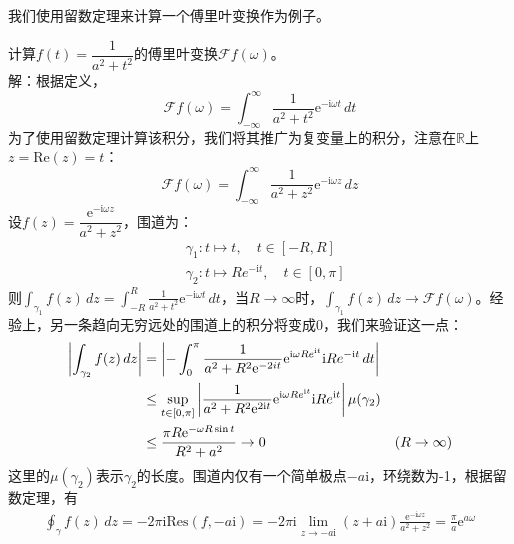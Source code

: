 我们使用留数定理来计算一个傅里叶变换作为例子。
\begin{example}
    计算$f(t)=\dfrac{1}{a^2+t^2}$的傅里叶变换$\mathcal{F} f(\omega)$。\\
    解：根据定义，$$\mathcal{F} f(\omega)=\int_{-\infty}^{\infty}\dfrac{1}{a^2+t^2}\mathrm{e}^{-\mathrm{i}\omega t}\,dt$$
    为了使用留数定理计算该积分，我们将其推广为复变量上的积分，注意在$\mathbb{R}$上$z=\mathrm{Re}(z)=t$：
    \[\mathcal{F} f(\omega)=\int_{-\infty}^{\infty}\frac{1}{a^2+z^2}\mathrm{e}^{-\mathrm{i}\omega z}\,dz\]
    设$f(z)=\dfrac{\mathrm{e}^{-\mathrm{i}\omega z}}{a^2+z^2}$，围道为：\begin{align*}
        &\gamma_1:t\mapsto t,\quad t\in[-R,R]\\
        &\gamma_2:t\mapsto Re^{-\mathrm{i}t},\quad t\in[0,\pi]
    \end{align*}
    则$\int_{\gamma_1}f(z)\,dz=\int_{-R}^{R}\frac{1}{a^2+t^2}\mathrm{e}^{-\mathrm{i}\omega t}\,dt$，当$R\to\infty$时，$\int_{\gamma_1}f(z)\,dz\to \mathcal{F} f(\omega)$。经验上，另一条趋向无穷远处的围道上的积分将变成0，我们来验证这一点：\begin{align*}
        \left|\int_{\gamma_2}f(z)\,dz\right|&=\left|-\int_0^{\pi}\frac{1}{a^2+R^2\mathrm{e}^{-2it}}\mathrm{e}^{\mathrm{i}\omega Re^{\mathrm{i}t}}\mathrm{i}Re^{-\mathrm{i}t}\,dt\right|\\
        &\leq \sup_{t\in[0,\pi]}\left|\frac{1}{a^2+R^2\mathrm{e}^{2\mathrm{i}t}}\mathrm{e}^{\mathrm{i}\omega Re^{\mathrm{i}t}}\mathrm{i}Re^{\mathrm{i}t}\right|\mu(\gamma_2)\\
        &\leq \frac{\pi R\mathrm{e}^{-\omega R\sin t}}{R^2+a^2}\to 0&(R\to\infty)
    \end{align*}
    这里的$\mu(\gamma_2)$表示$\gamma_2$的长度。围道内仅有一个简单极点$-a\mathrm{i}$，环绕数为-1，根据留数定理，有
    \begin{align*}
        \oint_{\gamma}f(z)\,dz=-2\pi \mathrm{i}\mathrm{Res}(f,-a\mathrm{i})=-2\pi \mathrm{i}\lim_{z\to -a\mathrm{i}}(z+a\mathrm{i})\frac{\mathrm{e}^{-\mathrm{i}\omega z}}{a^2+z^2}=\frac{\pi}{a}\mathrm{e}^{a\omega}
    \end{align*}
\end{example}

